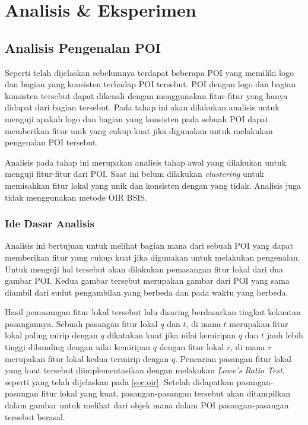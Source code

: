 \chapter{Analisis \& Eksperimen}
\label{chap:analisis}

\section{Analisis Pengenalan POI}
\label{sec:analisis_poi}
Seperti telah dijelaskan sebelumnya terdapat beberapa POI yang memiliki logo dan bagian yang konsisten terhadap POI tersebut. POI dengan logo dan bagian konsisten tersebut dapat dikenali dengan menggunakan fitur-fitur yang hanya didapat dari bagian tersebut. Pada tahap ini akan dilakukan analisis untuk menguji apakah logo dan bagian yang konsisten pada sebuah POI dapat memberikan fitur unik yang cukup kuat jika digunakan untuk melakukan pengenalan POI tersebut.

Analisis pada tahap ini merupakan analisis tahap awal yang dilakukan untuk menguji fitur-fitur dari POI. Saat ini belum dilakukan \textit{clustering} untuk memisahkan fitur lokal yang unik dan konsisten dengan yang tidak. Analisis juga tidak menggunakan metode OIR BSIS.

\subsection{Ide Dasar Analisis}
Analisis ini bertujuan untuk melihat bagian mana dari sebuah POI yang dapat memberikan fitur yang cukup kuat jika digunakan untuk melakukan pengenalan. Untuk menguji hal tersebut akan dilakukan pemasangan fitur lokal dari dua gambar POI. Kedua gambar tersebut merupakan gambar dari POI yang sama diambil dari sudut pengambilan yang berbeda dan pada waktu yang berbeda. 

Hasil pemasangan fitur lokal tersebut lalu disaring berdasarkan tingkat kekuatan pasangannya. Sebuah pasangan fitur lokal $q$ dan $t$, di mana $t$ merupakan fitur lokal paling mirip dengan $q$ dikatakan kuat jika nilai kemiripan $q$ dan $t$ jauh lebih tinggi dibanding dengan nilai kemiripan $q$ dengan fitur lokal $r$, di mana $r$ merupakan fitur lokal kedua termirip dengan $q$. Pencarian pasangan fitur lokal yang kuat tersebut diimplementasikan dengan melakukan \textit{Lowe's Ratio Test}, seperti yang telah dijelaskan pada \ref{sec:oir}. Setelah didapatkan pasangan-pasangan fitur lokal yang kuat, pasangan-pasangan tersebut akan ditampilkan dalam gambar untuk melihat dari objek mana dalam POI pasangan-pasangan tersebut berasal. 

